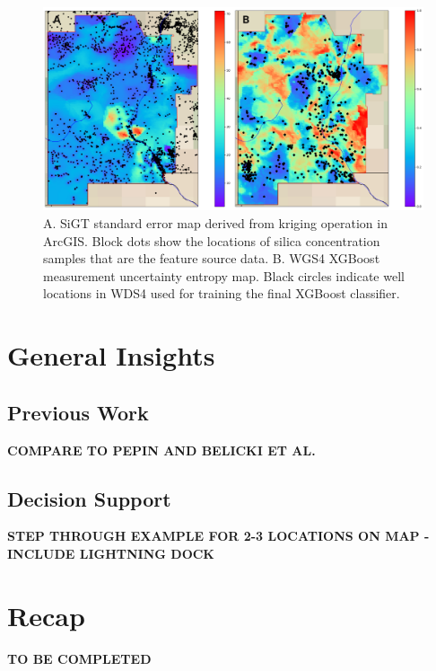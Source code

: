 \begin{figure}[!htp]
\centering
\includegraphics[width=\textwidth]{templates/images/Figure-MU_StdErr_vs_Uncert.png}
\caption[SiGT standard error and model entropy]
{A. SiGT standard error map derived from kriging operation in ArcGIS. Block dots show the locations of silica concentration samples that are the feature source data. B. WGS4 XGBoost measurement uncertainty entropy map. Black circles indicate well locations in WDS4 used for training the final XGBoost classifier. }
\label{fig:mu_stderr_entropy}
\end{figure}

\section{General Insights}\label{ch5:general_insights}
\subsection{Previous Work}
\textbf{COMPARE TO PEPIN AND BELICKI ET AL.}

\subsection{Decision Support}
\textbf{STEP THROUGH EXAMPLE FOR 2-3 LOCATIONS ON MAP - INCLUDE LIGHTNING DOCK}

\section{Recap}\label{ch5:recap}
\textbf{TO BE COMPLETED}


